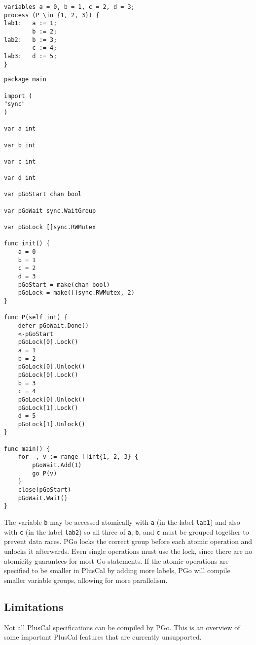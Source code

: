 \noindent
\begin{minipage}[t]{0.45\textwidth}
\begin{lstlisting}[language=pcal]
variables a = 0, b = 1, c = 2, d = 3;
process (P \in {1, 2, 3}) {
lab1:   a := 1;
        b := 2;
lab2:   b := 3;
        c := 4;
lab3:   d := 5;
}
\end{lstlisting}
\end{minipage}
\hfill
\begin{minipage}[t]{0.45\textwidth}
\begin{lstlisting}[language=golang]
package main

import (
"sync"
)

var a int

var b int

var c int

var d int

var pGoStart chan bool

var pGoWait sync.WaitGroup

var pGoLock []sync.RWMutex

func init() {
	a = 0
	b = 1
	c = 2
	d = 3
	pGoStart = make(chan bool)
	pGoLock = make([]sync.RWMutex, 2)
}

func P(self int) {
	defer pGoWait.Done()
	<-pGoStart
	pGoLock[0].Lock()
	a = 1
	b = 2
	pGoLock[0].Unlock()
	pGoLock[0].Lock()
	b = 3
	c = 4
	pGoLock[0].Unlock()
	pGoLock[1].Lock()
	d = 5
	pGoLock[1].Unlock()
}

func main() {
	for _, v := range []int{1, 2, 3} {
		pGoWait.Add(1)
		go P(v)
	}
	close(pGoStart)
	pGoWait.Wait()
}
\end{lstlisting}
\end{minipage}
The variable \texttt{b} may be accessed atomically with \texttt{a} (in the label \texttt{lab1}) and also with \texttt{c} (in the label \texttt{lab2}) so all three of \texttt{a}, \texttt{b}, and \texttt{c} must be grouped together to prevent data races. PGo locks the correct group before each atomic operation and unlocks it afterwards. Even single operations must use the lock, since there are no atomicity guarantees for most Go statements. If the atomic operations are specified to be smaller in PlusCal by adding more labels, PGo will compile smaller variable groups, allowing for more parallelism.

\subsection{Limitations}
Not all PlusCal specifications can be compiled by PGo. This is an overview of some important PlusCal features that are currently unsupported.

